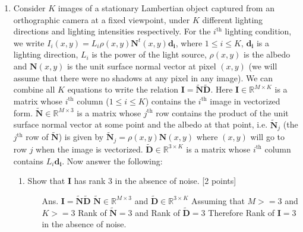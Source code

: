 \documentclass[11pt]{article}
\begin{document}
\begin{enumerate}
\item Consider $K$ images of a stationary Lambertian object captured from an orthographic camera at a fixed viewpoint, under $K$ different lighting directions and lighting intensities respectively. For the $i^{\textrm{th}}$ lighting condition, we write $I_i(x,y) = L_i \rho(x,y) \mathbf{N}^t(x,y) \mathbf{d_i}$, where $1 \leq i \leq K$, $\mathbf{d_i}$ is a lighting direction, $L_i$ is the power of the light source, $\rho(x,y)$ is the albedo and $\mathbf{N}(x,y)$ is the unit surface normal vector at pixel $(x,y)$ (we will assume that there were no shadows at any pixel in any image). We can combine all $K$ equations to write the relation $\mathbf{I} = \mathbf{\tilde{N}} \mathbf{\tilde{D}}$. Here $\mathbf{I} \in \mathbb{R}^{M \times K}$ is a matrix whose $i^{\textrm{th}}$ column ($1 \leq i \leq K$) contains the $i^{\textrm{th}}$ image in vectorized form. $\mathbf{\tilde{N}} \in \mathbb{R}^{M \times 3}$ is a matrix whose $j^{\textrm{th}}$ row contains the product of the unit surface normal vector at some point and the albedo at that point, i.e. $\mathbf{\tilde{N}}_j$ (the $j^{\textrm{th}}$ row of $\mathbf{\tilde{N}}$) is given by $\mathbf{\tilde{N}}_j = \rho(x,y) \mathbf{N}(x,y)$ where $(x,y)$ will go to row $j$ when the image is vectorized. $\mathbf{\tilde{D}} \in \mathbb{R}^{3 \times K}$ is a matrix whose $i^{\textrm{th}}$ column contains $L_i \mathbf{d_i}$. Now answer the following:
\begin{enumerate} 
\item Show that $\mathbf{I}$ has rank 3 in the absence of noise. \textsf{[2 points]}\begin{itemize}
\item[Ans.]  $\mathbf{I} = \mathbf{\tilde{N}} \mathbf{\tilde{D}}$\newline
$\mathbf{\tilde{N}} \in \mathbb{R}^{M \times 3}$ and $\mathbf{\tilde{D}} \in \mathbb{R}^{3 \times K}$\newline
Assuming that $M >=3$ and $K >= 3$\newline
Rank of $\mathbf{\tilde{N}} = 3$ and Rank of $\mathbf{\tilde{D}} =3$ \newline
Therefore Rank of $\mathbf{I} = 3$ in the absence of noise.
\end{itemize}

\end{enumerate}
\end{enumerate}
\end{document}
